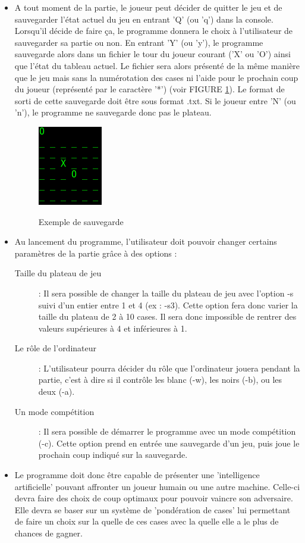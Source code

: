 \documentclass[10pt, a4paper]{article}
\begin{document}
\begin {itemize}
\item A tout moment de la partie, le joueur peut décider de quitter le jeu et de sauvegarder l'état actuel du jeu en entrant 'Q' (ou 'q') dans la console. Lorsqu'il décide de faire ça, le programme donnera le choix à l'utilisateur de sauvegarder sa partie ou non. En entrant 'Y' (ou 'y'), le programme sauvegarde alors dans un fichier le tour du joueur courant ('X' ou 'O') ainsi que l'état du tableau actuel. Le fichier sera alors présenté de la même manière que le jeu mais sans la numérotation des cases ni l'aide pour le prochain coup du joueur (représenté par le caractère '*') (voir FIGURE \ref{exemple_save}). Le format de sorti de cette sauvegarde doit être sous format .txt. Si le joueur entre 'N' (ou 'n'), le programme ne sauvegarde donc pas le plateau. %
  \begin {figure}[H]
    \centering
    \includegraphics [scale = 0.5]{images/exemple_sauvegarde.png}
    \label {exemple_save}
    \caption {Exemple de sauvegarde}
  \end   {figure}
  
\item Au lancement du programme, l'utilisateur doit pouvoir changer certains paramètres de la partie grâce à des options :
  \begin {description}
  \item [Taille du plateau de jeu] : Il sera possible de changer la taille du plateau de jeu avec l'option -s suivi d'un entier entre 1 et 4 (ex : -s3). Cette option fera donc varier la taille du plateau de 2 à 10 cases. Il sera donc impossible de rentrer des valeurs supérieures à 4 et inférieures à 1.
  \item [Le rôle de l'ordinateur]  : L'utilisateur pourra décider du rôle que l'ordinateur jouera pendant la partie, c'est à dire si il contrôle les blanc (-w), les noirs (-b), ou les deux (-a).
  \item [Un mode compétition]      : Il sera possible de démarrer le programme avec un mode compétition (-c). Cette option prend en entrée une sauvegarde d'un jeu, puis joue le prochain coup indiqué sur la sauvegarde.
  \end   {description}

\item Le programme doit donc être capable de présenter une 'intelligence artificielle' pouvant affronter un joueur humain ou une autre machine. Celle-ci devra faire des choix de coup optimaux pour pouvoir vaincre son adversaire. Elle devra se baser sur un système de 'pondération de cases' lui permettant de faire un choix sur la quelle de ces cases avec la quelle elle a le plus de chances de gagner.
\end   {itemize}
\end{document}
